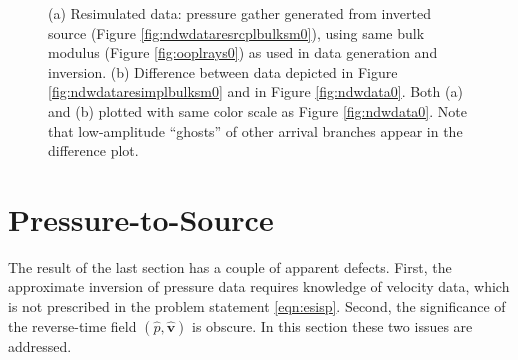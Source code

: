 \documentclass[12pt]{geophysics}
\newcommand{\bv}{\mathbf{v}}
\begin{document}
\begin{figure}
  \centering
  \caption{(a) Resimulated data: pressure gather generated from
    inverted source (Figure \ref{fig:ndwdataresrcplbulksm0}), using same
    bulk modulus (Figure \ref{fig:ooplrays0}) as used in data
    generation and inversion. (b) Difference
    between data depicted in Figure \ref{fig:ndwdataresimplbulksm0} and in Figure \ref{fig:ndwdata0}.
    Both (a) and (b) plotted with same color scale as Figure
    \ref{fig:ndwdata0}. Note that low-amplitude ``ghosts'' of other
    arrival branches appear in the difference plot.}
\end{figure}

\section{Pressure-to-Source}

The result of the last section has a couple of apparent
defects. First, the approximate inversion of pressure data requires
knowledge of velocity data, which is not prescribed in the problem
statement \ref{eqn:esisp}. Second, the significance of the
reverse-time field $(\hat{p},\hat{\bv})$ is obscure. In this section
these two issues are addressed.
\end{document}
